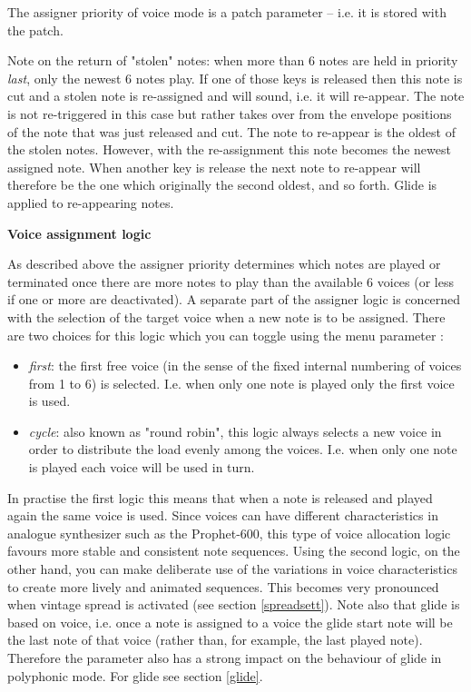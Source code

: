 The assigner priority of voice mode is a patch parameter -- i.e. it is stored with the patch. 

Note on the return of "stolen" notes: when more than 6 notes are held in priority \textit{last}, only the newest 6 notes play. If one of those keys is released then this note is cut and a stolen note is re-assigned and will sound, i.e. it will re-appear. The note is not re-triggered in this case but rather takes over from the envelope positions of the note that was just released and cut. The note to re-appear is the oldest of the stolen notes. However, with the re-assignment this note becomes the newest assigned note. When another key is release the next note to re-appear will therefore be the one which originally the second oldest, and so forth. Glide is applied to re-appearing notes.

\textbf{Voice assignment logic}

As described above the assigner priority determines which notes are played or terminated once there are more notes to play than the available 6 voices (or less if one or more are deactivated). A separate part of the assigner logic is concerned with the selection of the target voice when a new note is to be assigned. There are two choices for this logic which you can toggle using the menu parameter \assign:

\begin{itemize}
  \item \textit{first}: the first free voice (in the sense of the fixed internal numbering of voices from 1 to 6) is selected. I.e. when only one note is played only the first voice is used.
  \item \textit{cycle}: also known as "round robin", this logic always selects a new voice in order to distribute the load evenly among the voices. I.e. when only one note is played each voice will be used in turn.
\end{itemize} 

In practise the first logic this means that when a note is released and played again the same voice is used. Since voices can have different characteristics in analogue synthesizer such as the Prophet-600, this type of voice allocation logic favours more stable and consistent note sequences. Using the second logic, on the other hand, you can make deliberate use of the variations in voice characteristics to create more lively and animated sequences. This becomes very pronounced when vintage spread is activated (see section \ref{spreadsett}). Note also that glide is based on voice, i.e. once a note is assigned to a voice the glide start note will be the last note of that voice (rather than, for example, the last played note). Therefore the parameter \assign also has a strong impact on the behaviour of glide in polyphonic mode. For glide see section \ref{glide}.

